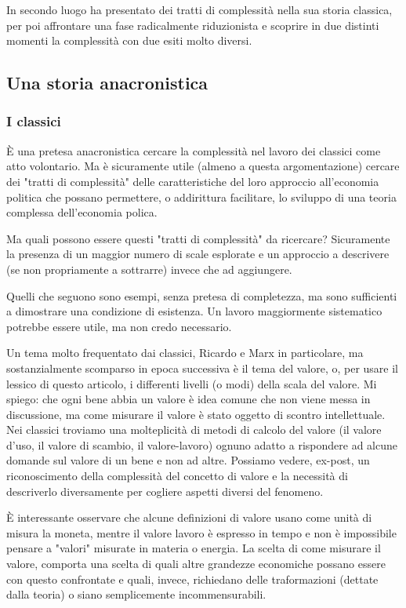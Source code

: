 \documentclass[a4paper, headings=standardclasses]{scrartcl}
\begin{document}
In secondo luogo ha presentato dei tratti di complessità nella sua storia classica, per poi affrontare una fase radicalmente riduzionista e scoprire in due distinti momenti la complessità con due esiti molto diversi.

\subsection{Una storia anacronistica}
\subsubsection{I classici}
È una pretesa anacronistica cercare la complessità nel lavoro dei classici come atto volontario. Ma è sicuramente utile (almeno a questa argomentazione) cercare dei "tratti di complessità" delle caratteristiche del loro approccio all'economia politica che possano permettere, o addirittura facilitare, lo sviluppo di una teoria complessa dell'economia polica.

Ma quali possono essere questi "tratti di complessità" da ricercare? Sicuramente la presenza di un maggior numero di scale esplorate e un approccio a descrivere (se non propriamente a sottrarre) invece che ad aggiungere.

Quelli che seguono sono esempi, senza pretesa di completezza, ma sono sufficienti a dimostrare una condizione di esistenza. Un lavoro maggiormente sistematico potrebbe essere utile, ma non credo necessario.

Un tema molto frequentato dai classici, Ricardo e Marx in particolare, ma sostanzialmente scomparso in epoca successiva è il tema del valore, o, per usare il lessico di questo articolo, i differenti livelli (o modi) della scala del valore. Mi spiego: che ogni bene abbia un valore è idea comune che non viene messa in discussione, ma come misurare il valore è stato oggetto di scontro intellettuale. Nei classici troviamo una molteplicità di metodi di calcolo del valore (il valore d'uso, il valore di scambio, il valore-lavoro) ognuno adatto a rispondere ad alcune domande sul valore di un bene e non ad altre. Possiamo vedere, ex-post, un riconoscimento della complessità del concetto di valore e la necessità di descriverlo diversamente per cogliere aspetti diversi del fenomeno.

È interessante osservare che alcune definizioni di valore usano come unità di misura la moneta, mentre il valore lavoro è espresso in tempo e non è impossibile pensare a "valori" misurate in materia o energia. La scelta di come misurare il valore, comporta una scelta di quali altre grandezze economiche possano essere con questo confrontate e quali, invece, richiedano delle traformazioni (dettate dalla teoria) o siano semplicemente incommensurabili.
\end{document}
